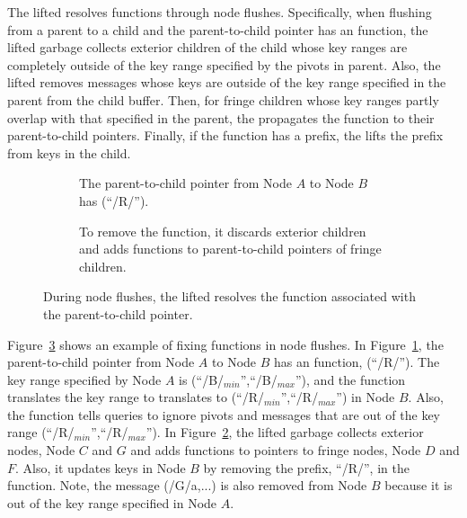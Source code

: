 The lifted \bedag resolves \xf functions through node flushes.
Specifically, when flushing from a parent to a child and the parent-to-child
pointer has an \xf function,
the lifted \bedag garbage collects exterior children of the child whose key
ranges are completely outside of the key range specified by the pivots in parent.
Also, the lifted \bedag removes messages whose keys are outside of the key
range specified in the parent from the child buffer.
Then, for fringe children whose key ranges partly overlap with that specified
in the parent, the \bedag propagates the \xf function to their parent-to-child
pointers.
Finally, if the \xf function has a prefix, the \bedag lifts the prefix from
keys in the child.

\begin{figure}
    \begin{subfigure}{\textwidth}
        \centering
        
        \caption{\label{subfig:xf-1} The parent-to-child pointer from Node $A$
            to Node $B$ has \xf(``/R/'').}
    \end{subfigure}
    \begin{subfigure}{\textwidth}
        \centering
        
        \caption{\label{subfig:xf-2} To remove the \xf function, it discards
            exterior children and adds \xf functions to parent-to-child pointers
            of fringe children.}
    \end{subfigure}
    \caption[Resolving \xf functions in node flushes]{\label{fig:xf}
        During node flushes, the lifted \bedag resolves the \xf
        function associated with the parent-to-child pointer.}
\end{figure}

Figure~\ref{fig:xf} shows an example of fixing \xf functions in node flushes.
In Figure~\ref{subfig:xf-1}, the parent-to-child pointer from Node $A$ to
Node $B$ has an \xf function, \xf(``/R/'').
The key range specified by Node $A$ is (``/B/$_{min}$'',``/B/$_{max}$''),
and the \xf function translates the key range to
translates to (``/R/$_{min}$'',``/R/$_{max}$'') in Node $B$.
Also, the \xf function tells queries to ignore pivots and messages that are
out of the key range (``/R/$_{min}$'',``/R/$_{max}$'').
In Figure~\ref{subfig:xf-2}, the lifted \bedag garbage collects exterior nodes,
Node $C$ and $G$
and adds \xf functions to pointers to fringe nodes, Node $D$ and $F$.
Also, it updates keys in Node $B$ by removing the prefix, ``/R/'',
in the \xf function.
Note, the message \putm(/G/a,...) is also removed from Node $B$
because it is out of the key range specified in Node $A$.

